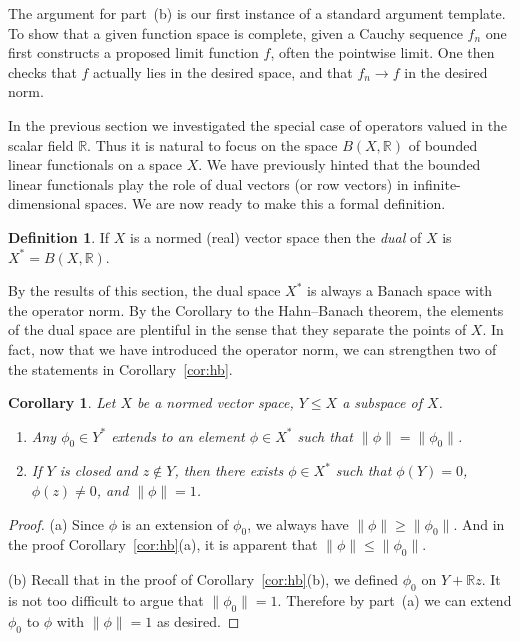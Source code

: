 \documentclass[11pt,oneside]{amsbook}
\newcommand{\RR}{{\mathbb R}}
\theoremstyle{definition}
\theoremstyle{plain}
\newtheorem{cor}[thm]{Corollary}
\theoremstyle{definition}
\newtheorem{defn}[thm]{Definition}
\theoremstyle{remark}
\numberwithin{equation}{section}
\numberwithin{figure}{section}
\begin{document}
The argument for part~(b) is our first instance of a standard argument template. To show that a given function space is complete, given a Cauchy sequence $f_n$ one first constructs a proposed limit function $f$, often the pointwise limit. One then checks that $f$ actually lies in the desired space, and that $f_n\to f$ in the desired norm.

In the previous section we investigated the special case of operators valued in the scalar field $\RR$. Thus it is natural to focus on the space $B(X,\RR)$ of bounded linear functionals on a space $X$. We have previously hinted that the bounded linear functionals play the role of dual vectors (or row vectors) in infinite-dimensional spaces. We are now ready to make this a formal definition.

\begin{defn}
  If $X$ is a normed (real) vector space then the \emph{dual} of $X$ is $X^*=B(X,\RR)$.
\end{defn}

By the results of this section, the dual space $X^*$ is always a Banach space with the operator norm. By the Corollary to the Hahn--Banach theorem, the elements of the dual space are plentiful in the sense that they separate the points of $X$. In fact, now that we have introduced the operator norm, we can strengthen two of the statements in Corollary~\ref{cor:hb}.

\begin{cor}
  \label{cor:hb2}
    Let $X$ be a normed vector space, $Y\leq X$ a subspace of $X$.
  \begin{enumerate}
  \item Any $\phi_0\in Y^*$ extends to an element $\phi\in X^*$ such that $\|\phi\|=\|\phi_0\|$.
  \item If $Y$ is closed and $z\notin Y$, then there exists $\phi\in X^*$ such that $\phi(Y)=0$, $\phi(z)\neq0$, and $\|\phi\|=1$.
  \end{enumerate}
\end{cor}

\begin{proof}
  (a) Since $\phi$ is an extension of $\phi_0$, we always have $\|\phi\|\geq\|\phi_0\|$. And in the proof Corollary~\ref{cor:hb}(a), it is apparent that $\|\phi\|\leq\|\phi_0\|$.

  (b) Recall that in the proof of Corollary~\ref{cor:hb}(b), we defined $\phi_0$ on $Y+\RR z$. It is not too difficult to argue that $\|\phi_0\|=1$. Therefore by part~(a) we can extend $\phi_0$ to $\phi$ with $\|\phi\|=1$ as desired.
\end{proof}
\end{document}
